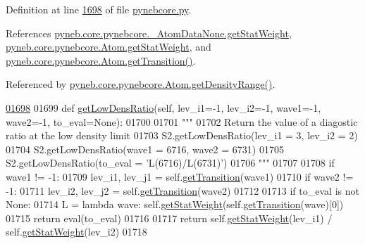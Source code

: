 Definition at line \hyperlink{pynebcore_8py_source_l01698}{1698} of file \hyperlink{pynebcore_8py_source}{pynebcore.\-py}.



References \hyperlink{pynebcore_8py_source_l00065}{pyneb.\-core.\-pynebcore.\-\_\-\-Atom\-Data\-None.\-get\-Stat\-Weight}, \hyperlink{pynebcore_8py_source_l01255}{pyneb.\-core.\-pynebcore.\-Atom.\-get\-Stat\-Weight}, and \hyperlink{pynebcore_8py_source_l01472}{pyneb.\-core.\-pynebcore.\-Atom.\-get\-Transition()}.



Referenced by \hyperlink{pynebcore_8py_source_l01742}{pyneb.\-core.\-pynebcore.\-Atom.\-get\-Density\-Range()}.


\begin{DoxyCode}
\hypertarget{classpyneb_1_1core_1_1pynebcore_1_1_atom_l01698}{}\hyperlink{classpyneb_1_1core_1_1pynebcore_1_1_atom_aa6db2a3425e5a35f0bd04f05bcb25ee1}{01698} 
01699     \textcolor{keyword}{def }\hyperlink{classpyneb_1_1core_1_1pynebcore_1_1_atom_aa6db2a3425e5a35f0bd04f05bcb25ee1}{getLowDensRatio}(self, lev\_i1=-1, lev\_i2=-1, wave1=-1, wave2=-1, to\_eval=None):
01700         
01701         \textcolor{stringliteral}{"""}
01702 \textcolor{stringliteral}{        Return the value of a diagostic ratio at the low density limit}
01703 \textcolor{stringliteral}{        S2.getLowDensRatio(lev\_i1 = 3, lev\_i2 = 2)}
01704 \textcolor{stringliteral}{        S2.getLowDensRatio(wave1 = 6716, wave2 = 6731)}
01705 \textcolor{stringliteral}{        S2.getLowDensRatio(to\_eval = 'L(6716)/L(6731)')}
01706 \textcolor{stringliteral}{        """}
01707         
01708         \textcolor{keywordflow}{if} wave1 != -1:
01709             lev\_i1, lev\_j1 = self.\hyperlink{classpyneb_1_1core_1_1pynebcore_1_1_atom_a7c9f17a3d9e841267add92377d9d1ede}{getTransition}(wave1)
01710         \textcolor{keywordflow}{if} wave2 != -1:
01711             lev\_i2, lev\_j2 = self.\hyperlink{classpyneb_1_1core_1_1pynebcore_1_1_atom_a7c9f17a3d9e841267add92377d9d1ede}{getTransition}(wave2)
01712             
01713         \textcolor{keywordflow}{if} to\_eval \textcolor{keywordflow}{is} \textcolor{keywordflow}{not} \textcolor{keywordtype}{None}:
01714             L = \textcolor{keyword}{lambda} wave: self.\hyperlink{classpyneb_1_1core_1_1pynebcore_1_1_atom_a0f2483487115f19556586b9e422bd5fb}{getStatWeight}(self.\hyperlink{classpyneb_1_1core_1_1pynebcore_1_1_atom_a7c9f17a3d9e841267add92377d9d1ede}{getTransition}(wave)[0])
01715             \textcolor{keywordflow}{return} eval(to\_eval)
01716             
01717         \textcolor{keywordflow}{return} self.\hyperlink{classpyneb_1_1core_1_1pynebcore_1_1_atom_a0f2483487115f19556586b9e422bd5fb}{getStatWeight}(lev\_i1) / self.\hyperlink{classpyneb_1_1core_1_1pynebcore_1_1_atom_a0f2483487115f19556586b9e422bd5fb}{getStatWeight}(lev\_i2)
01718         
        
\end{DoxyCode}
